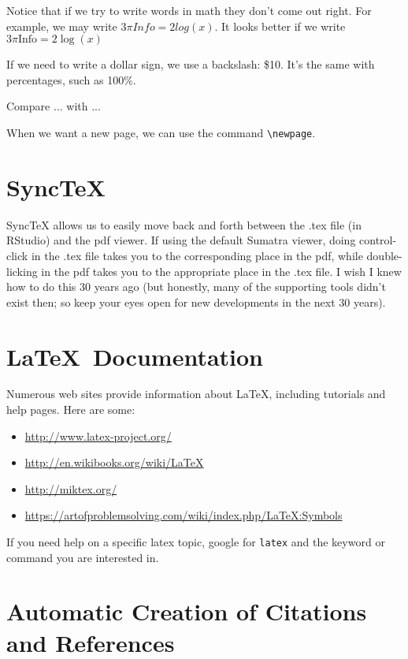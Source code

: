 \documentclass[12pt]{article}
\begin{document}
Notice that if we try to write words in math they don't come out right. For example, we may write $3\pi Info = 2 log(x)$. It looks better if we write $3\pi \mbox{Info} = 2 \log(x)$

If we need to write a dollar sign, we use a backslash: \$10. It's the same with percentages, such as 100\%.

Compare $\ldots$ with ...

When we want a new page, we can use the command \verb|\newpage|.


\section{ SyncTeX}

SyncTeX allows us to easily move back and forth between the .tex file (in RStudio) and the pdf viewer. If using the default Sumatra viewer, doing control-click in the .tex file takes you to the corresponding place in the pdf, while double-licking in the pdf takes you to the appropriate place in the .tex file. I wish I knew how to do this 30 years ago (but honestly, many of the supporting tools didn't exist then; so keep your eyes open for new developments in the next 30 years). 

\section{\LaTeX\ Documentation}\label{docs}

Numerous web sites provide information about \LaTeX,
including tutorials and help pages. Here are some:

\begin{itemize}
\item \url{http://www.latex-project.org/}
\item \url{http://en.wikibooks.org/wiki/LaTeX}
\item \url{http://miktex.org/}
\item \url{https://artofproblemsolving.com/wiki/index.php/LaTeX:Symbols}
\end{itemize}

If you need help on a specific latex topic, google for
\verb|latex| and the keyword or command you are interested in.


\newpage


\section{Automatic Creation of Citations and References}
\end{document}
